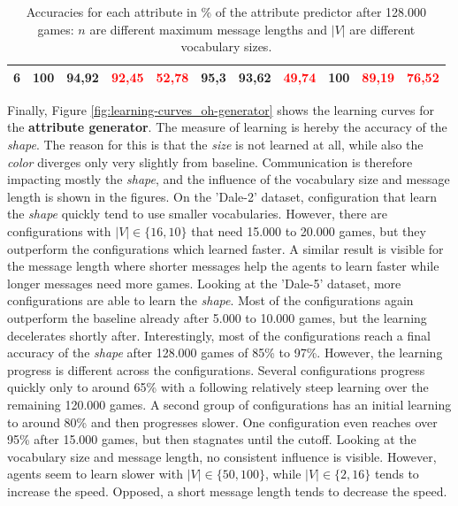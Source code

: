 \begin{table}[ht]
\begin{tabular}{cc|ccc|ccc|ccc}
        {6}                           & {100}   & {94,92}                             & \textcolor{red}{92,45}              & \textcolor{red}{52,78}                   & {95,3}                          & {93,62}                         & \textcolor{red}{49,74}         & {100}                           & \textcolor{red}{89,19}          & \textcolor{red}{76,52}         \\
        \bottomrule
    \end{tabular}
    \caption{Accuracies for each attribute in \% of the attribute predictor after 128.000 games: $n$ are different maximum message lengths and $|V|$ are different vocabulary sizes.}
    \label{tab:results:attribute-predictor-game}
\end{table}

Finally, Figure \ref{fig:learning-curves_oh-generator} shows the learning curves for the \textbf{attribute generator}.
The measure of learning is hereby the accuracy of the \emph{shape}.
The reason for this is that the \emph{size} is not learned at all, while also the \emph{color} diverges only very slightly from baseline.
Communication is therefore impacting mostly the \emph{shape}, and the influence of the vocabulary size and message length is shown in the figures.
On the 'Dale-2' dataset, configuration that learn the \emph{shape} quickly tend to use smaller vocabularies.
However, there are configurations with $|V| \in \{16,10\}$ that need 15.000 to 20.000 games, but they outperform the configurations which learned faster.
A similar result is visible for the message length where shorter messages help the agents to learn faster while longer messages need more games.
Looking at the 'Dale-5' dataset, more configurations are able to learn the \emph{shape}.
Most of the configurations again outperform the baseline already after 5.000 to 10.000 games, but the learning decelerates shortly after.
Interestingly, most of the configurations reach a final accuracy of the \emph{shape} after 128.000 games of 85\% to 97\%.
However, the learning progress is different across the configurations.
Several configurations progress quickly only to around 65\% with a following relatively steep learning over the remaining 120.000 games.
A second group of configurations has an initial learning to around 80\% and then progresses slower.
One configuration even reaches over 95\% after 15.000 games, but then stagnates until the cutoff.
Looking at the vocabulary size and message length, no consistent influence is visible.
However, agents seem to learn slower with $|V| \in \{50,100\}$, while $|V| \in \{2,16\}$ tends to increase the speed.
Opposed, a short message length tends to decrease the speed.

